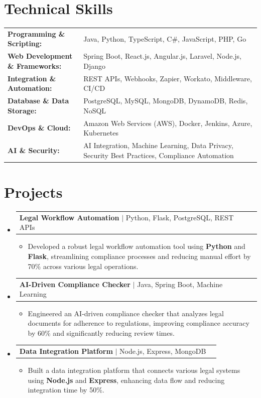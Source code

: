 \documentclass[letterpaper,10pt]{article}
\makeatletter
\newcommand{\resumeItem}[1]{
  \item{\fontsize{8pt}{9pt}\selectfont
    #1 \vspace{-3pt}
  }
}
\newcommand{\resumeProjectHeading}[2]{
    \item
    \begin{tabular*}{1.001\textwidth}{l@{\extracolsep{\fill}}r}
      \fontsize{8.5pt}{10pt}#1 & \textbf{\fontsize{8.5pt}{10pt} #2}\\
    \end{tabular*}\vspace{-7pt}
}
\newcommand{\resumeSubHeadingListStart}{\begin{itemize}[leftmargin=0pt, label={}]}
\newcommand{\resumeSubHeadingListEnd}{\end{itemize}}
\newcommand{\resumeItemListStart}{\begin{itemize}[leftmargin=*]}
\newcommand{\resumeItemListEnd}{\end{itemize}\vspace{-5pt}}
\makeatother
\begin{document}
\section{Technical Skills}
        \vspace{-14pt}
        \begin{table}[h]
            \fontsize{8pt}{9pt}\selectfont
            \begin{tabular}{p{0.3\linewidth} p{0.7\linewidth}}
                \textbf{Programming \& Scripting:} & Java, Python, TypeScript, C\#, JavaScript, PHP, Go \\
                \textbf{Web Development \& Frameworks:} & Spring Boot, React.js, Angular.js, Laravel, Node.js, Django \\
                \textbf{Integration \& Automation:} & REST APIs, Webhooks, Zapier, Workato, Middleware, CI/CD \\
                \textbf{Database \& Data Storage:} & PostgreSQL, MySQL, MongoDB, DynamoDB, Redis, NoSQL \\
                \textbf{DevOps \& Cloud:} & Amazon Web Services (AWS), Docker, Jenkins, Azure, Kubernetes \\
                \textbf{AI \& Security:} & AI Integration, Machine Learning, Data Privacy, Security Best Practices, Compliance Automation \\
            \end{tabular}
        \end{table}
 \vspace{-18pt}

\section{Projects}
    \vspace{-5pt}
    \resumeSubHeadingListStart
          \resumeProjectHeading
            {\textbf{Legal Workflow Automation} $|$ Python, Flask, PostgreSQL, REST APIs}{}
            \resumeItemListStart
                \resumeItem{Developed a robust legal workflow automation tool using \textbf{Python} and \textbf{Flask}, streamlining compliance processes and reducing manual effort by 70\% across various legal operations.}
            \resumeItemListEnd
        \vspace{-12pt}
    
        \resumeProjectHeading
            {\textbf{AI-Driven Compliance Checker} $|$ Java, Spring Boot, Machine Learning}{}
        \resumeItemListStart
                \resumeItem{Engineered an AI-driven compliance checker that analyzes legal documents for adherence to regulations, improving compliance accuracy by 60\% and significantly reducing review times.}
        \resumeItemListEnd
      \vspace{-12pt}
      \resumeProjectHeading
        {\textbf{Data Integration Platform} $|$ Node.js, Express, MongoDB}{}
    \resumeItemListStart
            \resumeItem{Built a data integration platform that connects various legal systems using \textbf{Node.js} and \textbf{Express}, enhancing data flow and reducing integration time by 50\%.}
    \resumeItemListEnd
    \resumeSubHeadingListEnd
\end{document}
